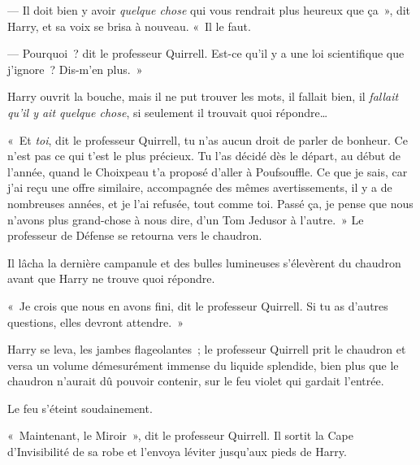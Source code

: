 --- Il doit bien y avoir \emph{quelque chose} qui vous rendrait plus heureux que ça~», dit Harry, et sa voix se brisa à nouveau.
«~Il le faut.

--- Pourquoi~? dit le professeur Quirrell.
Est-ce qu'il y a une loi scientifique que j'ignore~?
Dis-m'en plus.~»

Harry ouvrit la bouche, mais il ne put trouver les mots, il fallait bien, il \emph{fallait qu'il y ait quelque chose}, si seulement il trouvait quoi répondre…

«~Et \emph{toi}, dit le professeur Quirrell, tu n'as aucun droit de parler de bonheur.
Ce n'est pas ce qui t'est le plus précieux.
Tu l'as décidé dès le départ, au début de l'année, quand le Choixpeau t'a proposé d'aller à Poufsouffle.
Ce que je sais, car j'ai reçu une offre similaire, accompagnée des mêmes avertissements, il y a de nombreuses années, et je l'ai refusée, tout comme toi.
Passé ça, je pense que nous n'avons plus grand-chose à nous dire, d'un Tom Jedusor à l'autre.~»
Le professeur de Défense se retourna vers le chaudron.

Il lâcha la dernière campanule et des bulles lumineuses s'élevèrent du chaudron avant que Harry ne trouve quoi répondre.

«~Je crois que nous en avons fini, dit le professeur Quirrell.
Si tu as d'autres questions, elles devront attendre.~»

Harry se leva, les jambes flageolantes~; le professeur Quirrell prit le chaudron et versa un volume démesurément immense du liquide splendide, bien plus que le chaudron n'aurait dû pouvoir contenir, sur le feu violet qui gardait l'entrée.

Le feu s'éteint soudainement.

«~Maintenant, le Miroir~», dit le professeur Quirrell.
Il sortit la Cape d'Invisibilité de sa robe et l'envoya léviter jusqu'aux pieds de Harry.
